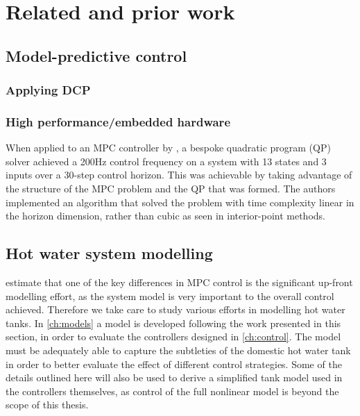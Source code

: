 \chapter{Related and prior work}
\label{ch:review}

\section{Model-predictive control}


\subsection{Applying DCP}


\subsection{High performance/embedded hardware}

When applied to an MPC controller by \textcite{Wang10}, a bespoke quadratic program (QP) solver achieved a 200Hz control frequency on a system with 13 states and 3 inputs over a 30-step control horizon.
This was achievable by taking advantage of the structure of the MPC problem and the QP that was formed.
The authors implemented an algorithm that solved the problem with time complexity linear in the horizon dimension, rather than cubic as seen in interior-point methods.


\section{Hot water system modelling}

 estimate that one of the key differences in MPC control is the significant up-front modelling effort, as the system model is very important to the overall control achieved.
Therefore we take care to study various efforts in modelling hot water tanks.
In \autoref{ch:models} a model is developed following the work presented in this section, in order to evaluate the controllers designed in \autoref{ch:control}.
The model must be adequately able to capture the subtleties of the domestic hot water tank in order to better evaluate the effect of different control strategies.
Some of the details outlined here will also be used to derive a simplified tank model used in the controllers themselves, as control of the full nonlinear model is beyond the scope of this thesis.

